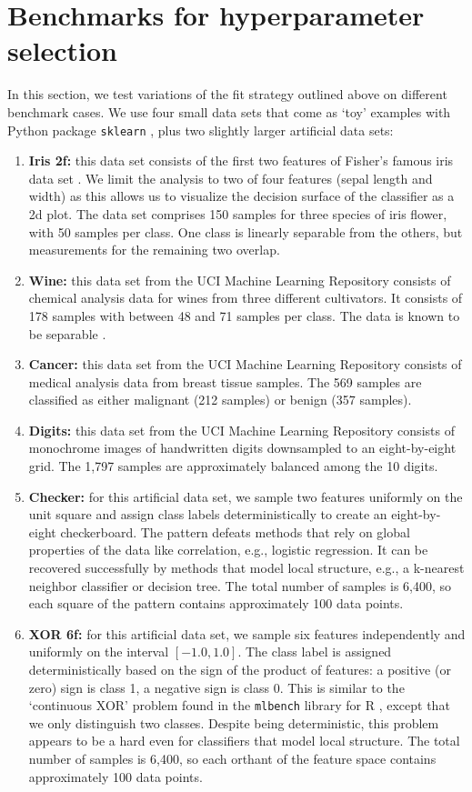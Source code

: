 \section{Benchmarks for hyperparameter selection}
\label{sec_classifier_benchmarks}
%
In this section, we test variations of the fit strategy outlined above on different benchmark cases.
We use four small data sets that come as `toy' examples with Python package \texttt{sklearn} \cite{Pedregosa_11}, plus two slightly larger artificial data sets:
%
\begin{enumerate}
\item\textbf{Iris 2f:} this data set consists of the first two features of Fisher's famous iris data set \cite{Fisher_36}.
We limit the analysis to two of four features (sepal length and width) as this allows us to visualize the decision surface of the classifier as a 2d plot.
The data set comprises 150 samples for three species of iris flower, with 50 samples per class.
One class is linearly separable from the others, but measurements for the remaining two overlap.
%
\item\textbf{Wine:} this data set from the  UCI Machine Learning Repository \cite{Dua_19} consists of chemical analysis data for wines from three different cultivators.
It consists of 178 samples with between 48 and 71 samples per class.
The data is known to be separable \cite{Aeberhard_92}.
%
\item\textbf{Cancer:} this data set from the UCI Machine Learning Repository \cite{Dua_19} consists of medical analysis data from breast tissue samples.
The 569 samples are classified as either malignant (212 samples) or benign (357 samples).
%
\item\textbf{Digits:} this data set from the UCI Machine Learning Repository \cite{Dua_19} consists of monochrome images of handwritten digits downsampled to an eight-by-eight grid.
The 1,797 samples are approximately balanced among the 10 digits.
%
\item\textbf{Checker:} for this artificial data set, we sample two features uniformly on the unit square and assign class labels deterministically to create an eight-by-eight checkerboard.
The pattern defeats methods that rely on global properties of the data like correlation, e.g., logistic regression.
It can be recovered successfully by methods that model local structure, e.g., a k-nearest neighbor classifier or decision tree.
The total number of samples is 6,400, so each square of the pattern contains approximately 100 data points.
%
\item\textbf{XOR 6f:} for this artificial data set, we sample six features independently and uniformly on the interval $[-1.0, 1.0]$.
The class label is assigned deterministically based on the sign of the product of features: a positive (or zero) sign is class 1, a negative sign is class 0.
This is similar to the `continuous XOR' problem found in the \texttt{mlbench} library for R \cite{Leisch_21}, except that we only distinguish two classes.
Despite being deterministic, this problem appears to be a hard even for classifiers that model local structure.
The total number of samples is 6,400, so each orthant of the feature space contains approximately 100 data points.
\end{enumerate}
